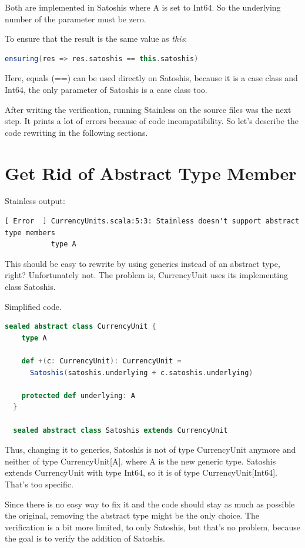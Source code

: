 Both are implemented in Satoshis where A is set to Int64.
So the underlying number of the parameter must be zero.

To ensure that the result is the same value as \emph{this}:
\begin{lstlisting}[language=scala]
  ensuring(res => res.satoshis == this.satoshis)
\end{lstlisting}

Here, equals (==) can be used directly on Satoshis, because it is a case class and Int64, the only parameter of Satoshis is a case class too.

After writing the verification, running Stainless on the source files was the next step.
It prints a lot of errors because of code incompatibility.
So let's describe the code rewriting in the following sections.


\section{Get Rid of Abstract Type Member}
Stainless output:
{\footnotesize\begin{verbatim}
[ Error  ] CurrencyUnits.scala:5:3: Stainless doesn't support abstract type members
           type A
\end{verbatim}}
This should be easy to rewrite by using generics instead of an abstract type, right?
Unfortunately not.
The problem is, CurrencyUnit uses its implementing class Satoshis.

Simplified code.
\begin{lstlisting}[language=scala]
  sealed abstract class CurrencyUnit {
    type A

    def +(c: CurrencyUnit): CurrencyUnit =
      Satoshis(satoshis.underlying + c.satoshis.underlying)

    protected def underlying: A
  }

  sealed abstract class Satoshis extends CurrencyUnit
\end{lstlisting}

Thus, changing it to generics, Satoshis is not of type CurrencyUnit anymore and neither of type CurrencyUnit[A], where A is the new generic type.
Satoshis extends CurrencyUnit with type Int64, so it is of type CurrencyUnit[Int64].
That's too specific.

Since there is no easy way to fix it and the code should stay as much as possible the original, removing the abstract type might be the only choice.
The verification is a bit more limited, to only Satoshis, but that's no problem, because the goal is to verify the addition of Satoshis.

